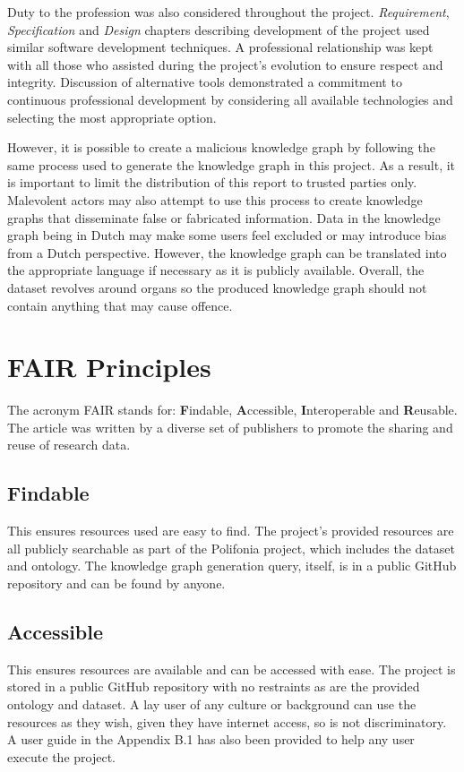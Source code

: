 Duty to the profession was also considered throughout the project. \textit{Requirement}, \textit{Specification} and \textit{Design} chapters describing development of the project used similar software development techniques. A professional relationship was kept with all those who assisted during the project's evolution to ensure respect and integrity. Discussion of alternative tools demonstrated a commitment to continuous professional development by considering all available technologies and selecting the most appropriate option.

However, it is possible to create a malicious knowledge graph by following the same process used to generate the knowledge graph in this project. As a result, it is important to limit the distribution of this report to trusted parties only. Malevolent actors may also attempt to use this process to create knowledge graphs that disseminate false or fabricated information. Data in the knowledge graph being in Dutch may make some users feel excluded or may introduce bias from a Dutch perspective. However, the knowledge graph can be translated into the appropriate language if necessary as it is publicly available. Overall, the dataset revolves around organs so the produced knowledge graph should not contain anything that may cause offence.

\section{FAIR Principles}
\hspace{0.5cm} The acronym FAIR stands for: \textbf{F}indable, \textbf{A}ccessible, \textbf{I}nteroperable and \textbf{R}eusable. The article \cite{fairprinciples} was written by a diverse set of publishers to promote the sharing and reuse of research data. 

\subsection{Findable}
\hspace{0.5cm} This ensures resources used are easy to find. The project's provided resources are all publicly searchable as part of the Polifonia project, which includes the dataset and ontology. The knowledge graph generation query, itself, is in a public GitHub repository and can be found by anyone. 

\subsection{Accessible}
\hspace{0.5cm} This ensures resources are available and can be accessed with ease. The project is stored in a public GitHub repository with no restraints as are the provided ontology and dataset. A lay user of any culture or background can use the resources as they wish, given they have internet access, so is not discriminatory. A user guide in the Appendix B.1 has also been provided to help any user execute the project. 

